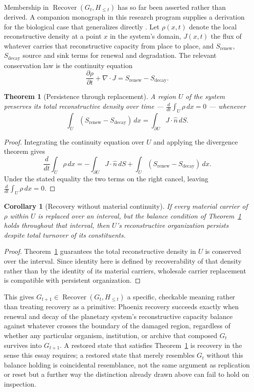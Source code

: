\documentclass[11pt]{article}
\newcommand{\Recover}{\operatorname{Recover}}
\newtheorem{theorem}{Theorem}
\newtheorem{corollary}{Corollary}
\begin{document}
Membership in $\Recover(G_t,H_{\leq t})$ has so far been asserted rather than derived. A companion monograph in this research program supplies a derivation for the biological case that generalizes directly \cite{flyxionMem8Monograph}. Let $\rho(x,t)$ denote the local reconstructive density at a point $x$ in the system's domain, $J(x,t)$ the flux of whatever carries that reconstructive capacity from place to place, and $S_{\mathrm{renew}}$, $S_{\mathrm{decay}}$ source and sink terms for renewal and degradation. The relevant conservation law is the continuity equation
\[
\frac{\partial \rho}{\partial t} + \nabla\cdot J = S_{\mathrm{renew}} - S_{\mathrm{decay}}.
\]

\begin{theorem}[Persistence through replacement]
\label{thm:persistence}
A region $U$ of the system preserves its total reconstructive density over time --- $\frac{d}{dt}\int_U \rho\,dx=0$ --- whenever
\[
\int_U (S_{\mathrm{renew}}-S_{\mathrm{decay}})\,dx = \int_{\partial U} J\cdot\hat{n}\,dS.
\]
\end{theorem}

\begin{proof}
Integrating the continuity equation over $U$ and applying the divergence theorem gives
\[
\frac{d}{dt}\int_U \rho\,dx = -\int_{\partial U} J\cdot\hat{n}\,dS + \int_U (S_{\mathrm{renew}}-S_{\mathrm{decay}})\,dx.
\]
Under the stated equality the two terms on the right cancel, leaving $\frac{d}{dt}\int_U \rho\,dx=0$.
\end{proof}

\begin{corollary}[Recovery without material continuity]
\label{cor:ship-of-theseus}
If every material carrier of $\rho$ within $U$ is replaced over an interval, but the balance condition of Theorem~\ref{thm:persistence} holds throughout that interval, then $U$'s reconstructive organization persists despite total turnover of its constituents.
\end{corollary}

\begin{proof}
Theorem~\ref{thm:persistence} guarantees the total reconstructive density in $U$ is conserved over the interval. Since identity here is defined by recoverability of that density rather than by the identity of its material carriers, wholesale carrier replacement is compatible with persistent organization.
\end{proof}

This gives $G_{t+1}\in\Recover(G_t,H_{\leq t})$ a specific, checkable meaning rather than treating recovery as a primitive: Phoenix recovery succeeds exactly when renewal and decay of the planetary system's reconstructive capacity balance against whatever crosses the boundary of the damaged region, regardless of whether any particular organism, institution, or archive that composed $G_t$ survives into $G_{t+1}$. A restored state that satisfies Theorem~\ref{thm:persistence} is recovery in the sense this essay requires; a restored state that merely resembles $G_t$ without this balance holding is coincidental resemblance, not the same argument as replication or reset but a further way the distinction already drawn above can fail to hold on inspection.
\end{document}
